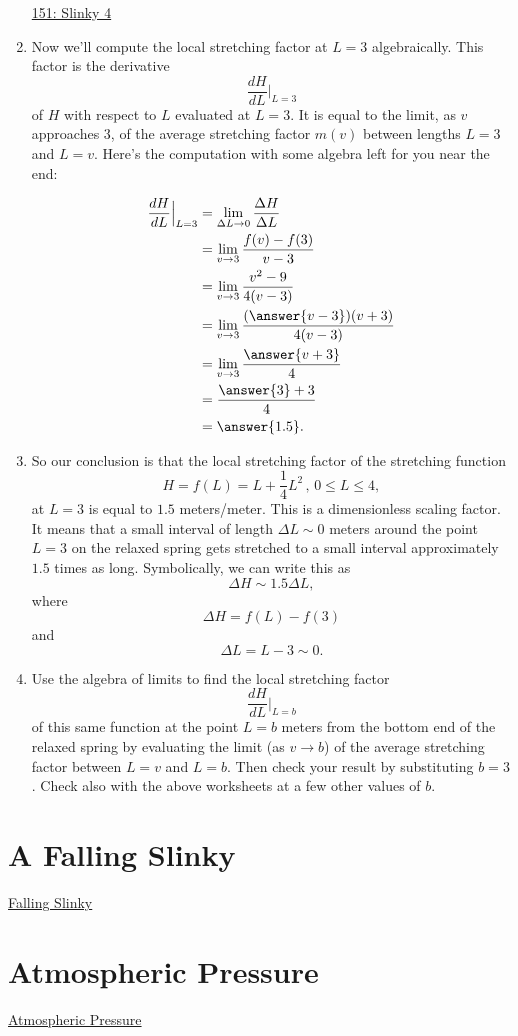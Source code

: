 \documentclass{ximera}
\begin{document}
\begin{example}
\begin{enumerate}
\href{https://www.desmos.com/calculator/zsbupxubm6}{151: Slinky 4}


\item Now we'll compute the local stretching factor at $L=3$ algebraically. This factor is the derivative
\[
  \frac{dH}{dL}\Big|_{L=3} 
\]
of $H$ with respect to $L$ evaluated at $L=3$. It is equal to the limit, as $v$ approaches $3$, of the average stretching factor $m(v)$ between lengths $L=3$ and $L=v$. Here's the computation with some algebra left for you near the end:

\begin{align*}
  \frac{dH}{dL}\Big|_{L=3} &= \lim_{\Delta L \to 0} \frac{\Delta H}{\Delta L} \\
              &= \lim_{v\to 3}\frac{f(v) - f(3)}{v-3} \\
              &= \lim_{v\to 3}\frac{v^2-9}{4(v-3)}   \\
              &= \lim_{v\to 3} \frac{(\answer{v-3})(v+3)}{4(v-3)} \\
              &=  \lim_{v\to 3} \frac{\answer{v+3}}{4} \\
              &= \frac{\answer{3}+3}{4}  \\
              &= \answer{1.5} .
\end{align*}

\item So our conclusion is that the local stretching factor of the stretching function
\[
      H = f(L) = L + \frac{1}{4}L^2 \, , \, 0\leq L \leq 4,
\]
at $L=3$ is equal to $1.5$ meters/meter. This is a dimensionless scaling factor. It means that a small interval of length $\Delta L\sim 0$ meters around the point $L=3$ on the relaxed spring gets stretched to a small interval approximately $1.5$ times as long. Symbolically, we can write this as
\[
          \Delta H \sim 1.5\Delta L,
\]
where
\[
   \Delta H = f(L) - f(3)
\]
and 
\[
    \Delta L = L - 3 \sim 0 .
\]

\item Use the algebra of limits to find the local stretching factor
\[
  \frac{dH}{dL}\Big|_{L=b}
\]
of this same function at the point $L=b$ meters from the bottom end of the relaxed spring by evaluating the limit (as $v\to b$) of the average stretching factor between $L=v$ and $L=b$. Then check your result by substituting $b=3$. Check also with the above worksheets at a few other values of $b$.
\end{enumerate}


\end{example}

\section{A Falling Slinky}

\href{https://www.youtube.com/watch?v=eCMmmEEyOO0}{Falling Slinky}


\section{Atmospheric Pressure}

\href{https://projects.iq.harvard.edu/files/acmg/files/intro_atmo_chem_bookchap2.pdf}{Atmospheric Pressure} 
\end{document}
